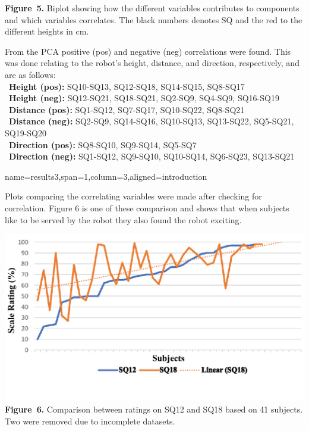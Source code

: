 \documentclass[paperwidth=118cm,paperheight=84cm,landscape,fontscale=0.2941]{baposter}
\begin{document}
\begin{poster}
{\begin{center}
\textbf{Figure~5. }\footnotesize{Biplot showing how the different variables contributes to components and which variables correlates. The black numbers denotes SQ and the red to the different heights in cm.}
\end{center}
\vspace{-10pt}
From the PCA positive (pos) and negative (neg) correlations were found. This was done relating to the robot's height, distance, and direction, respectively, and are as follows:\\
\textbullet~\textbf{Height (pos):}  SQ10-SQ13, SQ12-SQ18, SQ14-SQ15, SQ8-SQ17\\
\textbullet~\textbf{Height (neg):} SQ12-SQ21, SQ18-SQ21, SQ2-SQ9, SQ4-SQ9, SQ16-SQ19\\
\textbullet~\textbf{Distance (pos):} SQ1-SQ12, SQ7-SQ17, SQ10-SQ22, SQ8-SQ21\\
\textbullet~\textbf{Distance (neg):} SQ2-SQ9, SQ14-SQ16, SQ10-SQ13, SQ13-SQ22, SQ5-SQ21, SQ19-SQ20\\
\textbullet~\textbf{Direction (pos):} SQ8-SQ10, SQ9-SQ14, SQ5-SQ7\\
\textbullet~\textbf{Direction (neg):} SQ1-SQ12, SQ9-SQ10, SQ10-SQ14, SQ6-SQ23, SQ13-SQ21



	


}


\headerbox{ }
{name=results3,span=1,column=3,aligned=introduction}
{\parskip 5pt
Plots comparing the correlating variables were made after checking for correlation. Figure 6 is one of these comparison and shows that when subjects like to be served by the robot they also found the robot exciting. 
\begin{center}
\includegraphics[width=0.9\linewidth]{SQ12_SQ18.eps}
\textbf{Figure~6. }\footnotesize{Comparison between ratings on SQ12 and SQ18 based on 41 subjects. Two were removed due to incomplete datasets.}
\end{center}
}


\end{poster}
\end{document}
